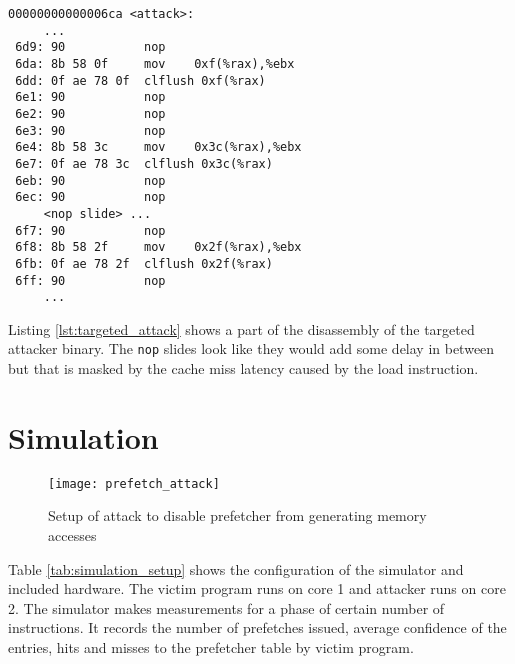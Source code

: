 \begin{lstlisting}[caption={Targeted attacker disassembly: loads at aliased PCs},
label={lst:targeted_attack}]
00000000000006ca <attack>:
     ...
 6d9: 90           nop
 6da: 8b 58 0f     mov    0xf(%rax),%ebx
 6dd: 0f ae 78 0f  clflush 0xf(%rax)
 6e1: 90           nop
 6e2: 90           nop
 6e3: 90           nop
 6e4: 8b 58 3c     mov    0x3c(%rax),%ebx
 6e7: 0f ae 78 3c  clflush 0x3c(%rax)
 6eb: 90           nop
 6ec: 90           nop
     <nop slide> ...
 6f7: 90           nop
 6f8: 8b 58 2f     mov    0x2f(%rax),%ebx
 6fb: 0f ae 78 2f  clflush 0x2f(%rax)
 6ff: 90           nop
     ...
\end{lstlisting}

Listing \ref{lst:targeted_attack} shows a part of the disassembly of the targeted
attacker binary.
The \texttt{nop} slides look like they would add some delay in between but
that is masked by the cache miss latency caused by the load instruction.

\section{Simulation}

\begin{figure}
    \centering
    \texttt{[image: prefetch\_attack]}
    \caption{Setup of attack to disable prefetcher from generating memory accesses}
    \label{fig:prefetch_setup}
\end{figure}

Table \ref{tab:simulation_setup} shows the configuration of
the simulator and included hardware.
The victim program runs on core 1 and attacker runs on core 2.
The simulator makes measurements for a phase of certain number of instructions.
It records the number of prefetches issued, average confidence of the entries,
hits and misses to the prefetcher table by victim program.

